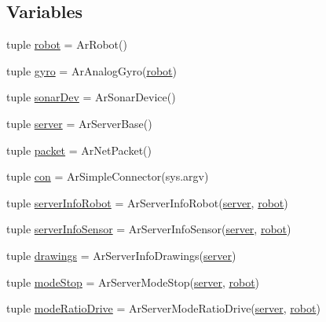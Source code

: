 \subsection*{Variables}
\begin{DoxyCompactItemize}
\item 
tuple \hyperlink{namespaceservidor_a20c40528942a814c3ba639d6fdf80c34}{robot} = ArRobot()
\item 
tuple \hyperlink{namespaceservidor_a73a7e14af1c6774da1d3c5580e02573c}{gyro} = ArAnalogGyro(\hyperlink{namespaceservidor_a20c40528942a814c3ba639d6fdf80c34}{robot})
\item 
tuple \hyperlink{namespaceservidor_a509c8beb9fe73900b5ab2a0fc5f793b2}{sonarDev} = ArSonarDevice()
\item 
tuple \hyperlink{namespaceservidor_adfced13b57fb69c12f8ab5a84d1a2356}{server} = ArServerBase()
\item 
tuple \hyperlink{namespaceservidor_a159e1bd236b55d72f3fd3cb94afc7650}{packet} = ArNetPacket()
\item 
tuple \hyperlink{namespaceservidor_ae78d17158a0f45369b3621468e736bf6}{con} = ArSimpleConnector(sys.argv)
\item 
tuple \hyperlink{namespaceservidor_a214f853047fdc2f26cfac0db1a9e87b8}{serverInfoRobot} = ArServerInfoRobot(\hyperlink{namespaceservidor_adfced13b57fb69c12f8ab5a84d1a2356}{server}, \hyperlink{namespaceservidor_a20c40528942a814c3ba639d6fdf80c34}{robot})
\item 
tuple \hyperlink{namespaceservidor_ae93d5f481f48442f0db6959867fbf8c4}{serverInfoSensor} = ArServerInfoSensor(\hyperlink{namespaceservidor_adfced13b57fb69c12f8ab5a84d1a2356}{server}, \hyperlink{namespaceservidor_a20c40528942a814c3ba639d6fdf80c34}{robot})
\item 
tuple \hyperlink{namespaceservidor_a691fe74e57a668507d56d3acd8e19ba2}{drawings} = ArServerInfoDrawings(\hyperlink{namespaceservidor_adfced13b57fb69c12f8ab5a84d1a2356}{server})
\item 
tuple \hyperlink{namespaceservidor_ae7b0d696eea14b76aba1e014dbfe70f4}{modeStop} = ArServerModeStop(\hyperlink{namespaceservidor_adfced13b57fb69c12f8ab5a84d1a2356}{server}, \hyperlink{namespaceservidor_a20c40528942a814c3ba639d6fdf80c34}{robot})
\item 
tuple \hyperlink{namespaceservidor_ac7cf650e754b329444bd902af26c1527}{modeRatioDrive} = ArServerModeRatioDrive(\hyperlink{namespaceservidor_adfced13b57fb69c12f8ab5a84d1a2356}{server}, \hyperlink{namespaceservidor_a20c40528942a814c3ba639d6fdf80c34}{robot})
\item 

\end{DoxyCompactItemize}
